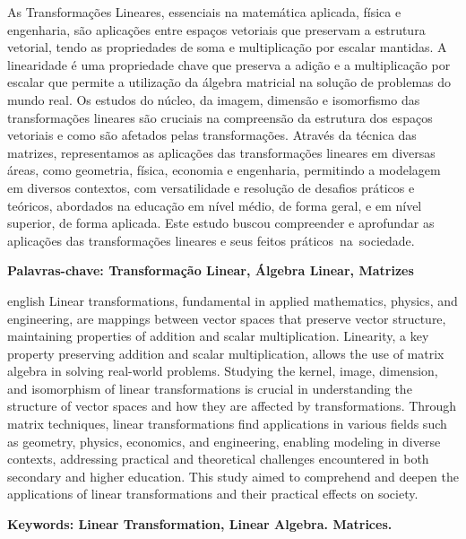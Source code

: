 \documentclass[
12pt,
 a4paper,
    english,
    brazil,
    oneside
    ]{abntex2}
\begin{document}
\setlength{\absparsep}{18pt} %
\begin{resumo}
	As Transformações Lineares, essenciais na matemática aplicada, física e engenharia, são aplicações entre espaços vetoriais que preservam a estrutura vetorial, tendo as propriedades de soma e multiplicação por escalar mantidas. A linearidade é uma propriedade chave que preserva a adição e a multiplicação por escalar que permite a utilização da álgebra matricial na solução de problemas do mundo real.
	Os estudos do núcleo, da imagem, dimensão e isomorfismo das transformações lineares são cruciais na compreensão da estrutura dos espaços vetoriais e como são afetados pelas transformações.
	Através da técnica das matrizes, representamos as aplicações das transformações lineares em diversas áreas, como geometria, física, economia e engenharia, permitindo a modelagem em diversos contextos, com versatilidade e resolução de desafios práticos e teóricos, abordados na educação em nível médio, de forma geral, e em nível superior, de forma aplicada.
	Este estudo buscou compreender e aprofundar as aplicações das transformações lineares e seus feitos práticos na sociedade.

	\textbf{Palavras-chave: Transformação Linear, Álgebra Linear, Matrizes}
\end{resumo}


\begin{resumo}[Abstract]
	\begin{otherlanguage*}{english}
		Linear transformations, fundamental in applied mathematics, physics, and engineering, are mappings between vector spaces that preserve vector structure, maintaining properties of addition and scalar multiplication. Linearity, a key property preserving addition and scalar multiplication, allows the use of matrix algebra in solving real-world problems. Studying the kernel, image, dimension, and isomorphism of linear transformations is crucial in understanding the structure of vector spaces and how they are affected by transformations. Through matrix techniques, linear transformations find applications in various fields such as geometry, physics, economics, and engineering, enabling modeling in diverse contexts, addressing practical and theoretical challenges encountered in both secondary and higher education. This study aimed to comprehend and deepen the applications of linear transformations and their practical effects on society.

		\vspace{\onelineskip}

		\noindent
		\textbf{Keywords: Linear Transformation, Linear Algebra. Matrices.}
	\end{otherlanguage*}
\end{resumo}
\end{document}
